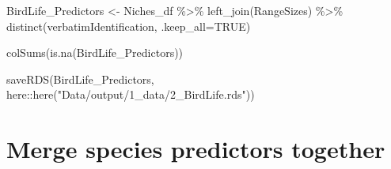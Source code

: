 \documentclass[
  letterpaper,
  DIV=11,
  numbers=noendperiod]{scrreprt}
\newenvironment{Shaded}{\begin{snugshade}}{\end{snugshade}}
\newcommand{\AttributeTok}[1]{\textcolor[rgb]{0.40,0.45,0.13}{#1}}
\newcommand{\ConstantTok}[1]{\textcolor[rgb]{0.56,0.35,0.01}{#1}}
\newcommand{\FunctionTok}[1]{\textcolor[rgb]{0.28,0.35,0.67}{#1}}
\newcommand{\NormalTok}[1]{\textcolor[rgb]{0.00,0.23,0.31}{#1}}
\newcommand{\OtherTok}[1]{\textcolor[rgb]{0.00,0.23,0.31}{#1}}
\newcommand{\SpecialCharTok}[1]{\textcolor[rgb]{0.37,0.37,0.37}{#1}}
\newcommand{\StringTok}[1]{\textcolor[rgb]{0.13,0.47,0.30}{#1}}
\begin{document}
\begin{Shaded}
\begin{Highlighting}[]
\NormalTok{BirdLife\_Predictors }\OtherTok{\textless{}{-}}\NormalTok{ Niches\_df }\SpecialCharTok{\%\textgreater{}\%}
  \FunctionTok{left\_join}\NormalTok{(RangeSizes) }\SpecialCharTok{\%\textgreater{}\%}
  \FunctionTok{distinct}\NormalTok{(verbatimIdentification, }\AttributeTok{.keep\_all=}\ConstantTok{TRUE}\NormalTok{)}

\FunctionTok{colSums}\NormalTok{(}\FunctionTok{is.na}\NormalTok{(BirdLife\_Predictors))}

\FunctionTok{saveRDS}\NormalTok{(BirdLife\_Predictors, here}\SpecialCharTok{::}\FunctionTok{here}\NormalTok{(}\StringTok{"Data/output/1\_data/2\_BirdLife.rds"}\NormalTok{))}
\end{Highlighting}
\end{Shaded}

\hypertarget{merge-species-predictors-together}{%
\section{Merge species predictors
together}\label{merge-species-predictors-together}}
\end{document}
